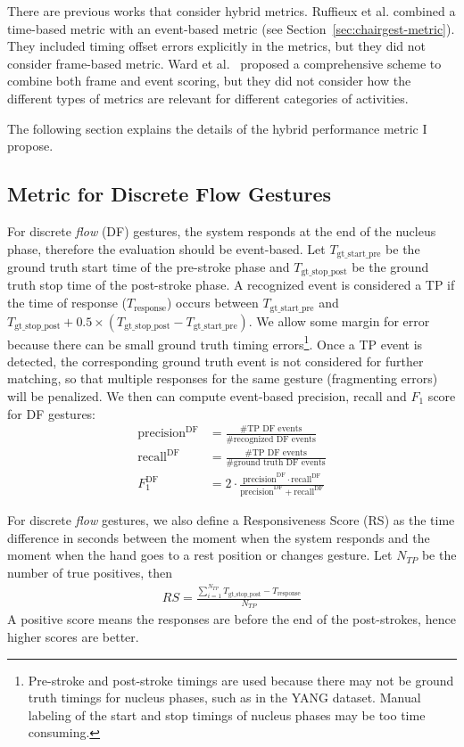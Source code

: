There are previous works that consider
hybrid metrics. Ruffieux et al.
combined a time-based metric with an event-based metric (see
Section~\ref{sec:chairgest-metric}). They included timing offset errors
explicitly in the metrics, but they did not consider frame-based metric. Ward et
al.~\cite{ward11} proposed a comprehensive scheme to combine both frame and
event scoring, but they did not consider how the different types of metrics are
relevant for different categories of activities.

The following section explains the details of the hybrid performance metric I
propose.

\subsection{Metric for Discrete Flow Gestures}
For discrete \textit{flow} (DF) gestures, the system responds at the end of the
nucleus phase, therefore the evaluation should be event-based. Let
$T_{{\text{gt\_start\_pre}}}$ be the ground truth start time of the pre-stroke phase and
$T_{{\text{gt\_stop\_post}}}$ be the ground truth stop time of the post-stroke
phase.
A recognized event is considered a TP if the time of response ($T_{\text{response}}$) 
occurs between $T_{{\text{gt\_start\_pre}}}$ and $T_{{\text{gt\_stop\_post}}} +
0.5\times(T_{{\text{gt\_stop\_post}}} -
T_{\text{gt\_start\_pre}})$.
We allow some margin for error because there can be small ground truth timing errors\footnote{Pre-stroke and post-stroke
timings are used because there may not be ground truth timings for nucleus
phases, such as in the YANG dataset. Manual labeling of the start and stop
timings of nucleus phases may be too time consuming.}.
Once a TP event is detected, the corresponding ground truth event is not
considered for further matching, so that multiple responses for the same gesture
(fragmenting errors) will be penalized. We then can compute event-based
precision, recall and $F_1$ score for DF gestures:
\begin{align}
\text{precision}^{\text{DF}} &=\frac{\text{\# TP DF events}}{\text{\# recognized
DF events}}
\\
\text{recall}^{\text{DF}} &=\frac{\text{\# TP DF events}}{\text{\# ground truth
DF events}} \\
F_1^{\text{DF}} &= 2\cdot \frac{\text{precision}^{\text{DF}} \cdot
\text{recall}^{\text{DF}}}{\text{precision}^{\text{DF}} +
\text{recall}^{\text{DF}}}
\end{align}

For discrete \textit{flow} gestures, we also define a Responsiveness Score (RS)
as the time difference in seconds between the moment when the system responds and the moment when the hand goes to a rest
position or changes gesture. Let $N_{TP}$ be the number of true positives, then
\begin{align}
RS = \frac{\sum_{i = 1}^{N_{TP}}T_{{\text{gt\_stop\_post}}} -
T_{\text{response}}}{N_{TP}}
\end{align}
A positive score means the responses are before the end of the post-strokes,
hence higher scores are better.

